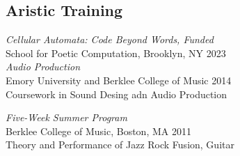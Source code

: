 \subsection{Aristic Training}
{\sl Cellular Automata: Code Beyond Words, Funded}\\
School for Poetic Computation, Brooklyn, NY\hfill
2023 \\

{\sl Audio Production}\\
Emory University and Berklee College of Music \hfill
2014 \\
Coursework in Sound Desing adn Audio Production


{\sl Five-Week Summer Program}\\
Berklee College of Music, Boston, MA \hfill
2011 \\
Theory and Performance of Jazz Rock Fusion, Guitar


